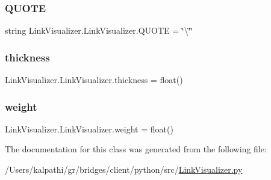 \hypertarget{class_link_visualizer_1_1_link_visualizer_a595bb37530287561ffcf304343f7cbde}{}\label{class_link_visualizer_1_1_link_visualizer_a595bb37530287561ffcf304343f7cbde} 
\subsubsection{\texorpdfstring{Q\+U\+O\+TE}{QUOTE}}
{\footnotesize\ttfamily string Link\+Visualizer.\+Link\+Visualizer.\+Q\+U\+O\+TE = \char`\"{}\textbackslash{}\char`\"{}\char`\"{}\hspace{0.3cm}{\ttfamily [static]}}

\hypertarget{class_link_visualizer_1_1_link_visualizer_af43b27883cc7b1427ad929b8f9717af9}{}\label{class_link_visualizer_1_1_link_visualizer_af43b27883cc7b1427ad929b8f9717af9} 
\subsubsection{\texorpdfstring{thickness}{thickness}}
{\footnotesize\ttfamily Link\+Visualizer.\+Link\+Visualizer.\+thickness = float()\hspace{0.3cm}{\ttfamily [static]}}

\hypertarget{class_link_visualizer_1_1_link_visualizer_ab3663261fc964c75d45b76803384d933}{}\label{class_link_visualizer_1_1_link_visualizer_ab3663261fc964c75d45b76803384d933} 
\subsubsection{\texorpdfstring{weight}{weight}}
{\footnotesize\ttfamily Link\+Visualizer.\+Link\+Visualizer.\+weight = float()\hspace{0.3cm}{\ttfamily [static]}}



The documentation for this class was generated from the following file\+:\begin{DoxyCompactItemize}
\item 
/\+Users/kalpathi/gr/bridges/client/python/src/\hyperlink{_link_visualizer_8py}{Link\+Visualizer.\+py}\end{DoxyCompactItemize}
